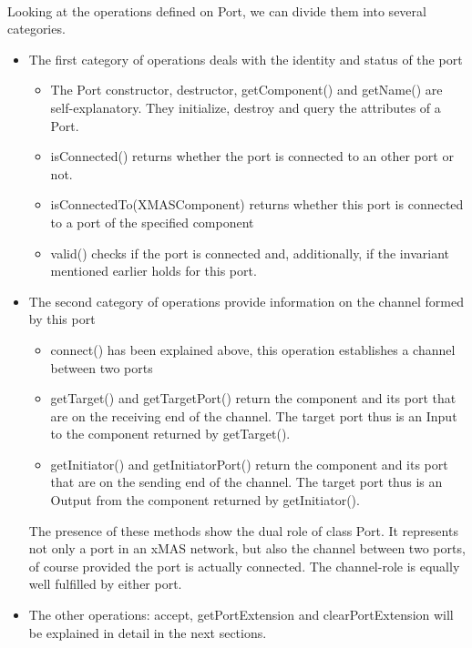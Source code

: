 \documentclass[a4paper,11pt]{article}
\begin{document}
\paragraph{}
Looking at the operations defined on Port, we can divide them into several categories.
\begin{itemize}
 \item The first category of operations deals with the identity and status of the port
 \begin{itemize}
  \item The Port constructor, destructor, getComponent() and getName() are self-explanatory. They initialize,
  destroy and query the attributes of a Port.
  \item isConnected() returns whether the port is connected to an other port or not.
  \item isConnectedTo(XMASComponent) returns whether this port is connected to a port of the specified component  
  \item valid() checks if the port is connected and, additionally, if the invariant mentioned earlier holds
  for this port.
 \end{itemize}
 
 \item The second category of operations provide information on the channel formed by this port
 \begin{itemize}
  \item connect() has been explained above, this operation establishes a channel between two ports
  \item getTarget() and getTargetPort() return the component and its port that are on the receiving end
  of the channel. The target port thus is an Input to the component returned by getTarget().
  \item getInitiator() and getInitiatorPort() return the component and its port that are on the sending end
  of the channel. The target port thus is an Output from the component returned by getInitiator().
 \end{itemize}
  The presence of these methods show the dual role of class Port. It represents not only a port in an
  xMAS network, but also the channel between two ports, of course provided the port is actually connected.
  The channel-role is equally well fulfilled by either port.
 \item The other operations: accept, getPortExtension and clearPortExtension will be explained in detail
 in the next sections.
\end{itemize}
\end{document}
